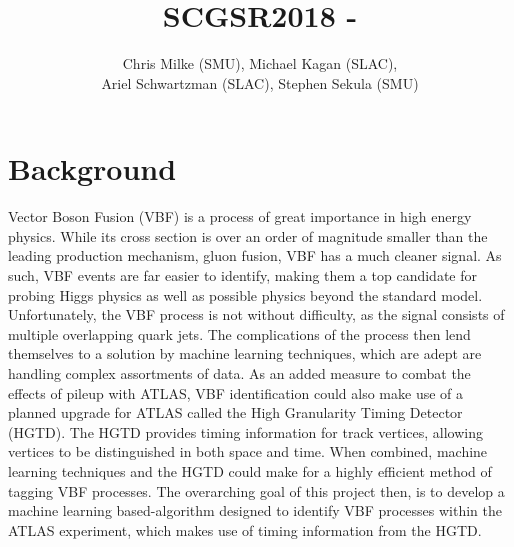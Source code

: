 \documentclass[12pt,letterpaper]{article}
\begin{document}
\pagestyle{fancy}


\pagestyle{plain}
\label{sec:coverpaqe}




\title{{\large SCGSR2018 - }}

\author{Chris Milke (SMU), Michael Kagan (SLAC),\\
  Ariel Schwartzman (SLAC), Stephen Sekula (SMU)}


\date{}

\maketitle

\newpage


\section*{Background}
    Vector Boson Fusion (VBF) is a process of great importance in high energy physics. While its cross section is over an order of magnitude smaller than the leading production mechanism, gluon fusion\cite{deFlorian:2016spz}, VBF has a much cleaner signal. As such, VBF events are far easier to identify, making them a top candidate for probing Higgs physics as well as possible physics beyond the standard model. Unfortunately, the VBF process is not without difficulty, as the signal consists of multiple overlapping quark jets. The complications of the process then lend themselves to a solution by machine learning techniques, which are adept are handling complex assortments of data. As an added measure to combat the effects of pileup with ATLAS, VBF identification could also make use of a planned upgrade for ATLAS called the High Granularity Timing Detector (HGTD). The HGTD provides timing information for track vertices, allowing vertices to be distinguished in both space and time. When combined, machine learning techniques and the HGTD could make for a highly efficient method of tagging VBF processes. The overarching goal of this project then, is to develop a machine learning based-algorithm designed to identify VBF processes within the ATLAS experiment, which makes use of timing information from the HGTD.
\end{document}
